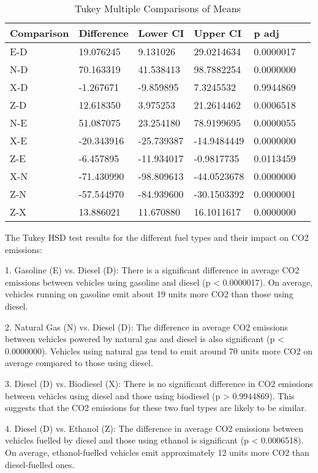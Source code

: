 \documentclass[12pt, a4paper,oneside]{book}
\numberwithin{equation}{section}
\begin{document}
\begin{table}[h]
\centering
\caption{Tukey Multiple Comparisons of Means}
\begin{tabular}{llllll}
\textbf{Comparison} & \textbf{Difference} & \textbf{Lower CI} & \textbf{Upper CI} & \textbf{p adj} \\
\hline
E-D & 19.076245 & 9.131026 & 29.0214634 & 0.0000017 \\
N-D & 70.163319 & 41.538413 & 98.7882254 & 0.0000000 \\
X-D & -1.267671 & -9.859895 & 7.3245532 & 0.9944869 \\
Z-D & 12.618350 & 3.975253 & 21.2614462 & 0.0006518 \\
N-E & 51.087075 & 23.254180 & 78.9199695 & 0.0000055 \\
X-E & -20.343916 & -25.739387 & -14.9484449 & 0.0000000 \\
Z-E & -6.457895 & -11.934017 & -0.9817735 & 0.0113459 \\
X-N & -71.430990 & -98.809613 & -44.0523678 & 0.0000000 \\
Z-N & -57.544970 & -84.939600 & -30.1503392 & 0.0000001 \\
Z-X & 13.886021 & 11.670880 & 16.1011617 & 0.0000000 \\
\hline
\end{tabular}
\end{table}


The Tukey HSD test results for the different fuel types and their impact on CO2 emissions:

1. Gasoline (E) vs. Diesel (D):
   There is a significant difference in average CO2 emissions between vehicles using gasoline and diesel (p < 0.0000017). On average, vehicles running on gasoline emit about 19 units more CO2 than those using diesel.

2. Natural Gas (N) vs. Diesel (D):
   The difference in average CO2 emissions between vehicles powered by natural gas and diesel is also significant (p < 0.0000000). Vehicles using natural gas tend to emit around 70 units more CO2 on average compared to those using diesel.

3. Diesel (D) vs. Biodiesel (X):
   There is no significant difference in CO2 emissions between vehicles using diesel and those using biodiesel (p > 0.9944869). This suggests that the CO2 emissions for these two fuel types are likely to be similar.

4. Diesel (D) vs. Ethanol (Z):
   The difference in average CO2 emissions between vehicles fuelled by diesel and those using ethanol is significant (p < 0.0006518). On average, ethanol-fuelled vehicles emit approximately 12 units more CO2 than diesel-fuelled ones.
\end{document}
